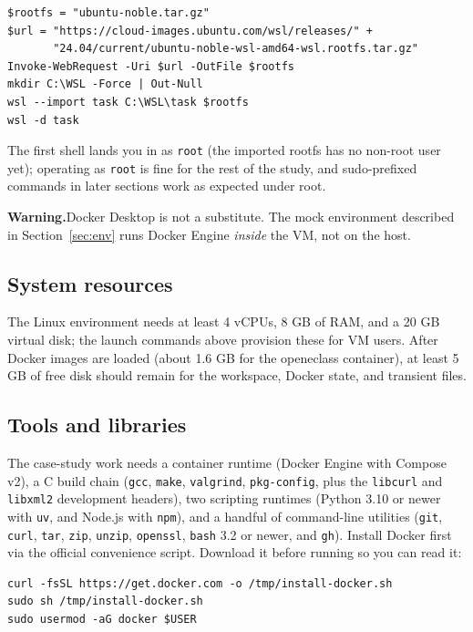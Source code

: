 \documentclass[11pt, a4paper]{article}
\newcommand{\warn}[1]{%
    \begin{mdframed}[linecolor=warnborder]
    \textbf{\textcolor{warnborder}{Warning.}}\enspace #1
    \end{mdframed}%
}
\begin{document}
\begin{verbatim}
$rootfs = "ubuntu-noble.tar.gz"
$url = "https://cloud-images.ubuntu.com/wsl/releases/" +
       "24.04/current/ubuntu-noble-wsl-amd64-wsl.rootfs.tar.gz"
Invoke-WebRequest -Uri $url -OutFile $rootfs
mkdir C:\WSL -Force | Out-Null
wsl --import task C:\WSL\task $rootfs
wsl -d task
\end{verbatim}

The first shell lands you in as \texttt{root} (the imported rootfs has no non-root user yet); operating as \texttt{root} is fine for the rest of the study, and sudo-prefixed commands in later sections work as expected under root.

\warn{Docker Desktop is not a substitute. The mock environment described in Section~\ref{sec:env} runs Docker Engine \emph{inside} the VM, not on the host.}

\subsection{System resources}
\label{sec:resources}

The Linux environment needs at least 4 vCPUs, 8 GB of RAM, and a 20 GB virtual disk; the launch commands above provision these for VM users. After Docker images are loaded (about 1.6 GB for the openeclass container), at least 5 GB of free disk should remain for the workspace, Docker state, and transient files.

\subsection{Tools and libraries}
\label{sec:tools}

The case-study work needs a container runtime (Docker Engine with Compose v2), a C build chain (\texttt{gcc}, \texttt{make}, \texttt{valgrind}, \texttt{pkg-config}, plus the \texttt{libcurl} and \texttt{libxml2} development headers), two scripting runtimes (Python 3.10 or newer with \texttt{uv}, and Node.js with \texttt{npm}), and a handful of command-line utilities (\texttt{git}, \texttt{curl}, \texttt{tar}, \texttt{zip}, \texttt{unzip}, \texttt{openssl}, \texttt{bash} 3.2 or newer, and \texttt{gh}). Install Docker first via the official convenience script. Download it before running so you can read it:

\begin{verbatim}
curl -fsSL https://get.docker.com -o /tmp/install-docker.sh
sudo sh /tmp/install-docker.sh
sudo usermod -aG docker $USER
\end{verbatim}
\end{document}
